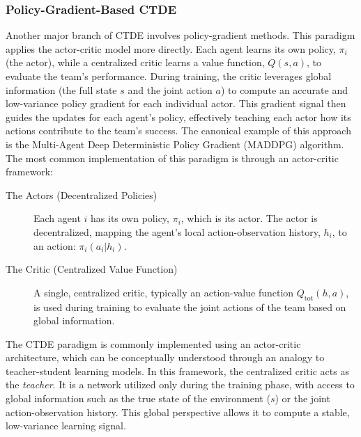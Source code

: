 \subsubsection{Policy-Gradient-Based CTDE}
Another major branch of CTDE involves policy-gradient methods. This paradigm applies the actor-critic model more directly. Each agent learns its own policy, $\pi_i$ (the actor), while a centralized critic learns a value function, $Q(s,a)$, to evaluate the team's performance. During training, the critic leverages global information (the full state $s$ and the joint action $a$) to compute an accurate and low-variance policy gradient for each individual actor. This gradient signal then guides the updates for each agent's policy, effectively teaching each actor how its actions contribute to the team's success. The canonical example of this approach is the Multi-Agent Deep Deterministic Policy Gradient (MADDPG) algorithm\parencite{MADDPG}.
The most common implementation of this paradigm is through an actor-critic framework:
\begin{description}
    \item[The Actors (Decentralized Policies)] Each agent $i$ has its own policy, $\pi_i$, which is its actor. The actor is decentralized, mapping the agent's local action-observation history, $h_i$, to an action: $\pi_i(a_i|h_i)$.
    \item[The Critic (Centralized Value Function)] A single, centralized critic, typically an action-value function $Q_{\text{tot}}(h,a)$, is used during training to evaluate the joint actions of the team based on global information.
\end{description}
The CTDE paradigm is commonly implemented using an actor-critic \parencite{ppo_ctde} architecture, which can be conceptually understood through an analogy to teacher-student learning models. In this framework, the centralized critic acts as the \textit{teacher}\parencite{CTDS}. It is a network utilized only during the training phase, with access to global information such as the true state of the environment ($s$) or the joint action-observation history. This global perspective allows it to compute a stable, low-variance learning signal.

